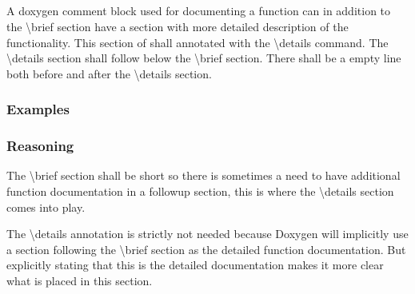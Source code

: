 \subsection*{\doxygenRule{}}

A doxygen comment block used for documenting a function can in addition to the  \textbackslash brief section have a section with more detailed description of the functionality. This section of shall annotated with the \textbackslash details command. The \textbackslash details section shall follow below the \textbackslash brief section. There shall be a empty line both before and after the \textbackslash details section.

\subsubsection*{Examples}

\noindent
\begin{minipage}[t]{0.47\textwidth}
    
\end{minipage}\hfill
\begin{minipage}[t]{0.47\textwidth}
    
\end{minipage}

\subsubsection*{Reasoning}

The \textbackslash brief section shall be short so there is sometimes a need to have additional function documentation in a followup section, this is where the \textbackslash details section comes into play.

The \textbackslash details annotation is strictly not needed because Doxygen will implicitly use a section following the \textbackslash brief section as the detailed function documentation. But explicitly stating that this is the detailed documentation makes it more clear what is placed in this section.
